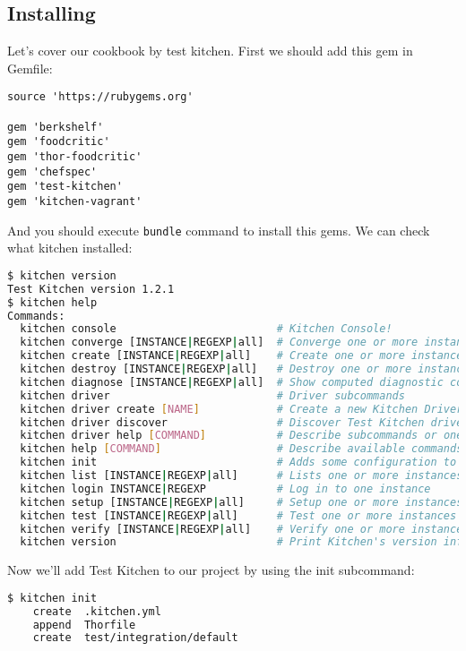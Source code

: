 \subsection{Installing}

Let's cover our cookbook by test kitchen. First we should add this gem in Gemfile:

\begin{lstlisting}[label=lst:testing-test-kitchen1]
source 'https://rubygems.org'

gem 'berkshelf'
gem 'foodcritic'
gem 'thor-foodcritic'
gem 'chefspec'
gem 'test-kitchen'
gem 'kitchen-vagrant'
\end{lstlisting}

And you should execute \lstinline!bundle! command to install this gems. We can check what kitchen installed:

\begin{lstlisting}[language=Bash,label=lst:testing-test-kitchen2]
$ kitchen version
Test Kitchen version 1.2.1
$ kitchen help
Commands:
  kitchen console                         # Kitchen Console!
  kitchen converge [INSTANCE|REGEXP|all]  # Converge one or more instances
  kitchen create [INSTANCE|REGEXP|all]    # Create one or more instances
  kitchen destroy [INSTANCE|REGEXP|all]   # Destroy one or more instances
  kitchen diagnose [INSTANCE|REGEXP|all]  # Show computed diagnostic configuration
  kitchen driver                          # Driver subcommands
  kitchen driver create [NAME]            # Create a new Kitchen Driver gem project
  kitchen driver discover                 # Discover Test Kitchen drivers published on RubyGems
  kitchen driver help [COMMAND]           # Describe subcommands or one specific subcommand
  kitchen help [COMMAND]                  # Describe available commands or one specific command
  kitchen init                            # Adds some configuration to your cookbook so Kitchen can rock
  kitchen list [INSTANCE|REGEXP|all]      # Lists one or more instances
  kitchen login INSTANCE|REGEXP           # Log in to one instance
  kitchen setup [INSTANCE|REGEXP|all]     # Setup one or more instances
  kitchen test [INSTANCE|REGEXP|all]      # Test one or more instances
  kitchen verify [INSTANCE|REGEXP|all]    # Verify one or more instances
  kitchen version                         # Print Kitchen's version information
\end{lstlisting}

Now we'll add Test Kitchen to our project by using the init subcommand:

\begin{lstlisting}[language=Bash,label=lst:testing-test-kitchen3]
$ kitchen init
    create  .kitchen.yml
    append  Thorfile
    create  test/integration/default
\end{lstlisting}

